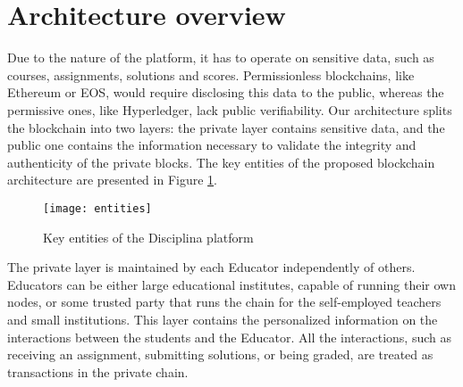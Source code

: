 \section{Architecture overview}
\label{sec:architecture}

Due to the nature of the platform, it has to operate on sensitive data, such as courses, assignments, solutions and scores. Permissionless blockchains, like Ethereum or EOS, would require disclosing this data to the public, whereas the permissive ones, like Hyperledger, lack public verifiability. Our architecture splits the blockchain into two layers: the private layer contains sensitive data, and the public one contains the information necessary to validate the integrity and authenticity of the private blocks. The key entities of the proposed blockchain architecture are presented in Figure \ref{fig:entities}.

\begin{figure}[ht]
\centering
\texttt{[image: entities]}
\caption{Key entities of the Disciplina platform}
\label{fig:entities}
\end{figure}

The private layer is maintained by each Educator independently of others. Educators can be either large educational institutes, capable of running their own nodes, or some trusted party that runs the chain for the self-employed teachers and small institutions. This layer contains the personalized information on the interactions between the students and the Educator. All the interactions, such as receiving an assignment, submitting solutions, or being graded, are treated as transactions in the private chain.

